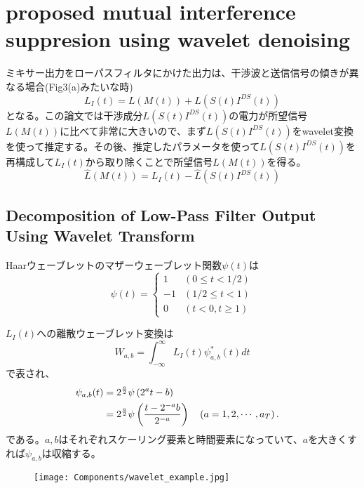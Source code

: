 \section{proposed mutual interference suppresion using wavelet denoising}
ミキサー出力をローパスフィルタにかけた出力は、干渉波と送信信号の傾きが異なる場合(Fig3(a)みたいな時)
\begin{equation}
    L_{I}(t)=L(M(t))+L\left(S(t) I^{D S}(t)\right)
\end{equation}
となる。この論文では干渉成分$L\left(S(t) I^{D S}(t)\right)$の電力が所望信号$L(M(t))$に比べて非常に大きいので、まず$L\left(S(t) I^{D S}(t)\right)$をwavelet変換を使って推定する。その後、推定したパラメータを使って$L\left(S(t) I^{D S}(t)\right)$を再構成して$L_I(t)$から取り除くことで所望信号$L(M(t))$を得る。
\begin{equation}
    \hat{L}(M(t))=L_{I}(t)-\hat{L}\left(S(t) I^{D S}(t)\right)
\end{equation}

\subsection{Decomposition of Low-Pass Filter Output Using Wavelet Transform}
Haarウェーブレットのマザーウェーブレット関数$\psi(t)$は
\begin{equation}
    \psi(t)=\left\{\begin{array}{lc}
    1 & (0 \leq t<1 / 2) \\
    -1 & (1 / 2 \leq t<1) \\
    0 & (t<0, t \geq 1)
    \end{array}\right.
\end{equation}

$L_I(t)$への離散ウェーブレット変換は
\begin{equation}
    W_{a, b}=\int_{-\infty}^{\infty} L_{I}(t) \psi_{a, b}^{*}(t) d t
\end{equation}
で表され、
\begin{align}
    \psi_{a, b}(t) &= 2^{\frac{a}{2}} \psi\left(2^{a} t-b\right)\cr
                   &= 2^{\frac{a}{2}} \psi\left(\frac{t-2^{-a}b}{2^{-a}}\right) \quad\left(a=1,2, \cdots, a_{T}\right) .
\end{align}
である。$a,b$はそれぞれスケーリング要素と時間要素になっていて、$a$を大きくすれば$\psi_{a,b}$は収縮する。
\begin{figure}[H]
    \centering
    \texttt{[image: Components/wavelet\_example.jpg]}    
\end{figure}

